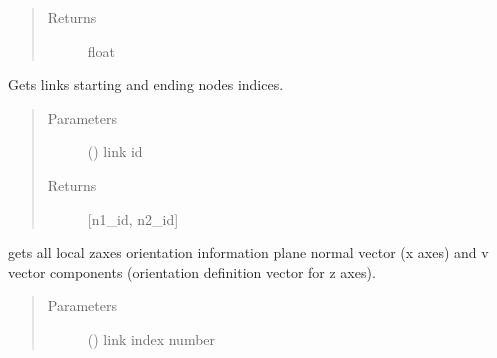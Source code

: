 \documentclass[letterpaper,10pt,english]{sphinxmanual}
\begin{document}
\begin{fulllineitems}
\begin{fulllineitems}
\begin{quote}
\begin{description}
\item[{Returns}] \leavevmode
float

\end{description}\end{quote}

\end{fulllineitems}


\begin{fulllineitems}
\label{\detokenize{api:beamon.database.database.Database.get_link_nodes}}
Gets links starting and ending nodes indices.
\begin{quote}\begin{description}
\item[{Parameters}] \leavevmode
{} () \textendash{} link id

\item[{Returns}] \leavevmode
{[}n1\_id, n2\_id{]}

\end{description}\end{quote}

\end{fulllineitems}


\begin{fulllineitems}
\label{\detokenize{api:beamon.database.database.Database.get_link_orientation}}
gets all local z\sphinxhyphen{}axes orientation information \sphinxhyphen{} plane normal vector (x axes) and v vector components
(orientation definition vector for z axes).
\begin{quote}\begin{description}
\item[{Parameters}] \leavevmode
{} () \textendash{} link index number


\end{description}
\end{quote}
\end{fulllineitems}
\end{fulllineitems}
\end{document}
